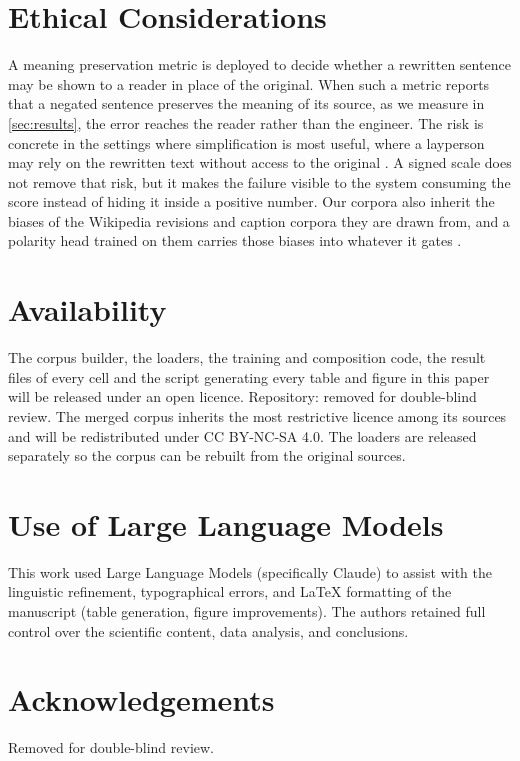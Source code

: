\documentclass[11pt]{article}
\begin{document}
\section*{Ethical Considerations}
A meaning preservation metric is deployed to decide whether a rewritten sentence may be shown to a reader in place of the original.
When such a metric reports that a negated sentence preserves the meaning of its source, as we measure in \autoref{sec:results}, the error reaches the reader rather than the engineer.
The risk is concrete in the settings where simplification is most useful, where a layperson may rely on the rewritten text without access to the original \citep{beauchemin2023meaningbert}.
A signed scale does not remove that risk, but it makes the failure visible to the system consuming the score instead of hiding it inside a positive number.
Our corpora also inherit the biases of the Wikipedia revisions and caption corpora they are drawn from, and a polarity head trained on them carries those biases into whatever it gates \citep{bender2021dangers}.

\section*{Availability}
The corpus builder, the loaders, the training and composition code, the result files of every cell and the script generating every table and figure in this paper will be released under an open licence.
Repository: removed for double-blind review.
The merged corpus inherits the most restrictive licence among its sources and will be redistributed under CC BY-NC-SA 4.0.
The loaders are released separately so the corpus can be rebuilt from the original sources.

\section*{Use of Large Language Models}
This work used Large Language Models (specifically Claude) to assist with the linguistic refinement, typographical errors, and LaTeX formatting of the manuscript (table generation, figure improvements).
The authors retained full control over the scientific content, data analysis, and conclusions.

\section*{Acknowledgements}
Removed for double-blind review.
\end{document}
